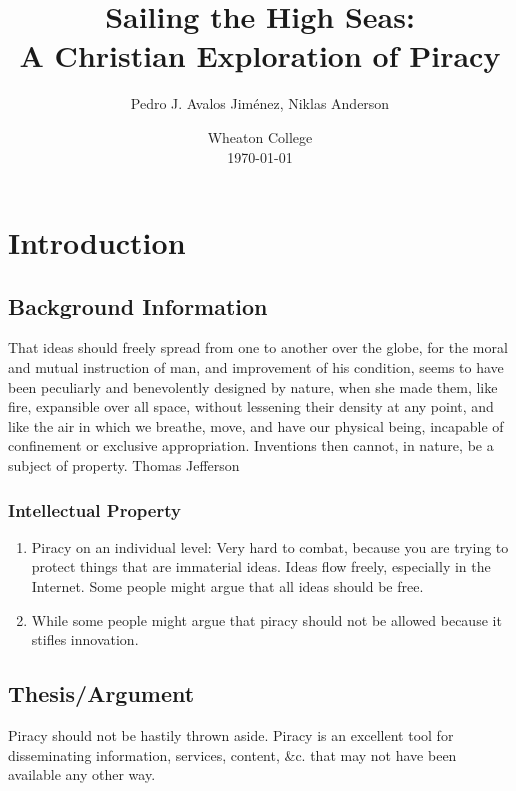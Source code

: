 \documentclass[onecolumn, 12pt]{article}
\title{Sailing the High Seas:\\ A Christian Exploration of Piracy}
\author{Pedro J. Avalos Jim\'enez, Niklas Anderson}
\date{Wheaton College\\\today}
\begin{document}
\maketitle

\section{Introduction}

\subsection{Background Information}

\begin{displayquote}
  \textins That ideas should freely spread from one to another over the globe, for the
    moral and mutual instruction of man, and improvement of his condition, seems to have been
    peculiarly and benevolently designed by nature, when she made them, like fire, expansible
    over all space, without lessening their density at any point, and like the air in which we
    breathe, move, and have our physical being, incapable of confinement or exclusive
    appropriation. Inventions then cannot, in nature, be a subject of property.  Thomas
    Jefferson ~\cite{barlow:wine}
\end{displayquote}


\subsubsection{Intellectual Property}

\begin{enumerate}
  \item Piracy on an individual level: Very hard to combat, because you are
    trying to protect things that are immaterial ideas. Ideas flow freely,
    especially in the Internet. Some people might argue that all ideas should
    be free.

  \item While some people might argue that piracy should not be allowed because
    it stifles innovation.
\end{enumerate}

\subsection{Thesis/Argument}

Piracy should not be hastily thrown aside.
Piracy is an excellent tool for disseminating information, services, content,
\&c. that may not have been available any other way.
\end{document}
